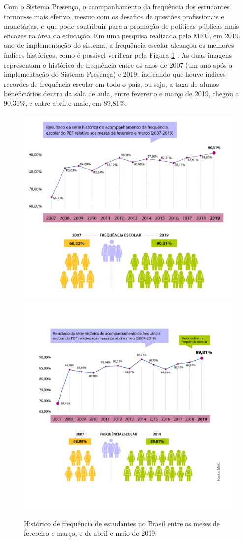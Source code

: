 Com o Sistema Presença, o acompanhamento da frequência dos estudantes tornou-se mais efetivo, mesmo com os desafios de questões profissionais e monetárias, o que pode contribuir para a promoção de políticas públicas mais eficazes na área da educação. Em uma pesquisa realizada pelo MEC, em 2019, ano de implementação do sistema, a frequência escolar alcançou os melhores índices históricos, como é possível verificar pela Figura \ref{fig:my_label} \cite{historicos2019}. As duas imagens representam o histórico de frequência entre os anos de 2007 (um ano após a implementação do Sistema Presença) e 2019, indicando que houve índices recordes de frequência escolar em todo o país; ou seja, a taxa de alunos beneficiários dentro da sala de aula, entre fevereiro e março de 2019, chegou a 90,31\%, e entre abril e maio, em 89,81\%.

\begin{figure}[ht!]
    \centering
    \includegraphics[width=0.46\linewidth]{Textuais/Imagens/image1.png}
    \includegraphics[width=0.46\linewidth]{Textuais/Imagens/image.png}
    \caption{Histórico de frequência de estudantes no Brasil entre os meses de fevereiro e março, e de abril e maio de 2019.}
    \label{fig:my_label}
\end{figure}


